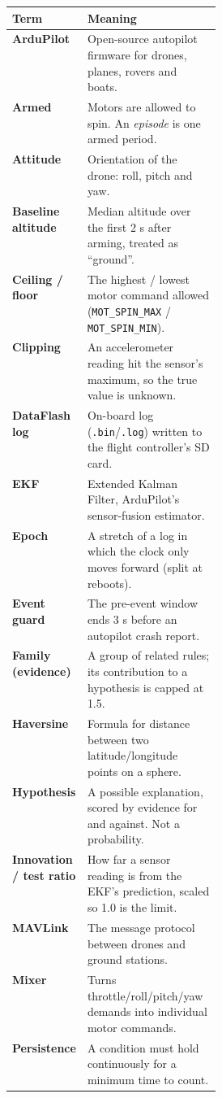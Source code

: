 \documentclass[11pt,a4paper,openany]{book}
\begin{document}
\begin{center}\small
\begin{tabularx}{\linewidth}{p{0.30\linewidth}X}
\toprule
Term & Meaning \\
\midrule
\textbf{ArduPilot} & Open-source autopilot firmware for drones, planes, rovers and boats. \\
\textbf{Armed} & Motors are allowed to spin. An \emph{episode} is one armed period. \\
\textbf{Attitude} & Orientation of the drone: roll, pitch and yaw. \\
\textbf{Baseline altitude} & Median altitude over the first 2 s after arming, treated as ``ground''. \\
\textbf{Ceiling / floor} & The highest / lowest motor command allowed (\texttt{MOT\_\allowbreak{}SPIN\_\allowbreak{}MAX} / \texttt{MOT\_\allowbreak{}SPIN\_\allowbreak{}MIN}). \\
\textbf{Clipping} & An accelerometer reading hit the sensor's maximum, so the true value is unknown. \\
\textbf{DataFlash log} & On-board log (\texttt{.bin}/\texttt{.log}) written to the flight controller's SD card. \\
\textbf{EKF} & Extended Kalman Filter, ArduPilot's sensor-fusion estimator. \\
\textbf{Epoch} & A stretch of a log in which the clock only moves forward (split at reboots). \\
\textbf{Event guard} & The pre-event window ends 3 s before an autopilot crash report. \\
\textbf{Family (evidence)} & A group of related rules; its contribution to a hypothesis is capped at 1.5. \\
\textbf{Haversine} & Formula for distance between two latitude/longitude points on a sphere. \\
\textbf{Hypothesis} & A possible explanation, scored by evidence for and against. Not a probability. \\
\textbf{Innovation / test ratio} & How far a sensor reading is from the EKF's prediction, scaled so 1.0 is the limit. \\
\textbf{MAVLink} & The message protocol between drones and ground stations. \\
\textbf{Mixer} & Turns throttle/roll/pitch/yaw demands into individual motor commands. \\
\textbf{Persistence} & A condition must hold continuously for a minimum time to count. \\

\end{tabularx}
\end{center}
\end{document}
